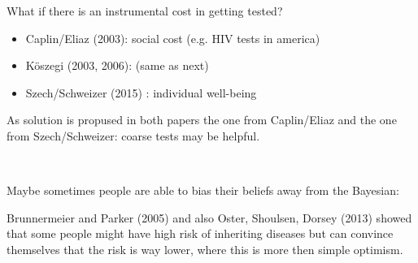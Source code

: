 What if there is an instrumental cost in getting tested?
\begin{itemize}
	\item Caplin/Eliaz (2003): social cost (e.g. HIV tests in america)
	\item Köszegi (2003, 2006): (same as next)
	\item Szech/Schweizer (2015) : individual well-being
\end{itemize}

As solution is propused in both papers the one from Caplin/Eliaz and the one from Szech/Schweizer: coarse tests may be helpful.

~\newline

Maybe sometimes people are able to bias their beliefs away from the Bayesian:
 
Brunnermeier and Parker (2005) and also Oster, Shoulsen, Dorsey (2013) showed that some people might have high risk of inheriting diseases but can convince themselves that the risk is way lower, where this is more then simple optimism. \\



\newpage